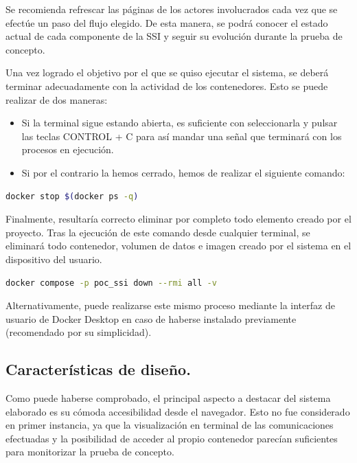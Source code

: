 \documentclass[../main.tex]{subfiles}
\begin{document}
\begin{tcolorbox}[colback=gray!10!white, colframe=gray!50!black, title=Observación]\label{recomendacion}
Se recomienda refrescar las páginas de los actores involucrados cada vez que se efectúe un paso del flujo elegido. De esta manera, se podrá conocer el estado actual de cada componente de la \acrshort{SSI} y seguir su evolución durante la prueba de concepto.
\end{tcolorbox}

\noindent Una vez logrado el objetivo por el que se quiso ejecutar el sistema, se deberá terminar adecuadamente con la actividad de los contenedores. Esto se puede realizar de dos maneras:

\begin{itemize}
    \item Si la terminal sigue estando abierta, es suficiente con seleccionarla y pulsar las teclas CONTROL + C para así mandar una señal que terminará con los procesos en ejecución.
    \item Si por el contrario la hemos cerrado, hemos de realizar el siguiente comando:
\end{itemize}
\begin{lstlisting}[language=sh]
  docker stop $(docker ps -q)
\end{lstlisting}

\noindent Finalmente, resultaría correcto eliminar por completo todo elemento creado por el proyecto. Tras la ejecución de este comando desde cualquier terminal, se eliminará todo contenedor, volumen de datos e imagen creado por el sistema en el dispositivo del usuario.
\begin{lstlisting}[language=sh]
  docker compose -p poc_ssi down --rmi all -v
\end{lstlisting}

Alternativamente, puede realizarse este mismo proceso mediante la interfaz de usuario de Docker Desktop en caso de haberse instalado previamente (recomendado por su simplicidad).


\newpage
\subsection{Características de diseño.}\label{Características de diseño}
Como puede haberse comprobado, el principal aspecto a destacar del sistema elaborado es su cómoda accesibilidad desde el navegador. Esto no fue considerado en primer instancia, ya que la visualización en terminal de las comunicaciones efectuadas y la posibilidad de acceder al propio contenedor parecían suficientes para monitorizar la prueba de concepto. 
\\
\end{document}
